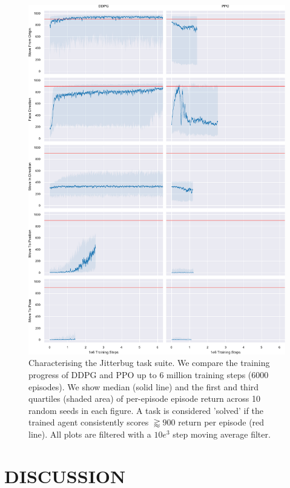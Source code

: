 \documentclass[letterpaper, 10 pt, conference]{ieeeconf}
\begin{document}
\begin{figure}[p]
    
    \centering
    \includegraphics[height=0.94\textheight]{fig-rl-perf}
    
    \caption{
        Characterising the Jitterbug task suite.
        We compare the training progress of DDPG and PPO up to 6 million training steps (6000 episodes).
        We show median (solid line) and the first and third quartiles (shaded area) of per-episode episode return across 10 random seeds in each figure.
        A task is considered 'solved' if the trained agent consistently scores $\gtrapprox 900$ return per episode (red line).
        All plots are filtered with a $10e^3$ step moving average filter.
    }
    
    \label{fig:rl-perf}
\end{figure}

\section{DISCUSSION}
\end{document}
